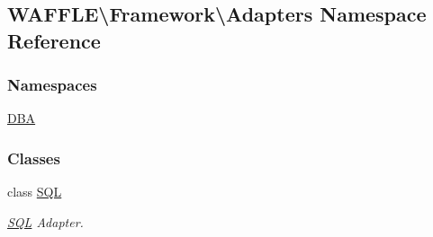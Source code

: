 \hypertarget{namespace_w_a_f_f_l_e_1_1_framework_1_1_adapters}{}\subsection{W\+A\+F\+F\+LE\textbackslash{}Framework\textbackslash{}Adapters Namespace Reference}
\label{namespace_w_a_f_f_l_e_1_1_framework_1_1_adapters}
\subsubsection*{Namespaces}
\begin{DoxyCompactItemize}
\item 
 \hyperlink{namespace_w_a_f_f_l_e_1_1_framework_1_1_adapters_1_1_d_b_a}{D\+BA}
\end{DoxyCompactItemize}
\subsubsection*{Classes}
\begin{DoxyCompactItemize}
\item 
class \hyperlink{class_w_a_f_f_l_e_1_1_framework_1_1_adapters_1_1_s_q_l}{S\+QL}
\begin{DoxyCompactList}\small\item\em \hyperlink{class_w_a_f_f_l_e_1_1_framework_1_1_adapters_1_1_s_q_l}{S\+QL} Adapter. \end{DoxyCompactList}\end{DoxyCompactItemize}
